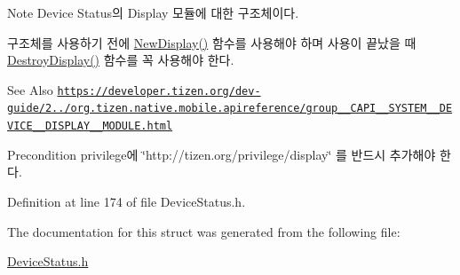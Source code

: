 \begin{DoxyNote}{Note}
Device Status의 Display 모듈에 대한 구조체이다. \par
 구조체를 사용하기 전에 \hyperlink{DeviceStatus_8h_a239d9485c4000ae77b11e5f12378f95f}{New\-Display()} 함수를 사용해야 하며 사용이 끝났을 때 \hyperlink{DeviceStatus_8h_aa18ddc0342d1ca47145c759a8fa35d91}{Destroy\-Display()} 함수를 꼭 사용해야 한다. 
\end{DoxyNote}
\begin{DoxySeeAlso}{See Also}
\href{https://developer.tizen.org/dev-guide/2.3.0/org.tizen.native.mobile.apireference/group__CAPI__SYSTEM__DEVICE__DISPLAY__MODULE.html}{\tt https\-://developer.\-tizen.\-org/dev-\/guide/2../org.\-tizen.\-native.\-mobile.\-apireference/group\-\_\-\-\_\-\-C\-A\-P\-I\-\_\-\-\_\-\-S\-Y\-S\-T\-E\-M\-\_\-\-\_\-\-D\-E\-V\-I\-C\-E\-\_\-\-\_\-\-D\-I\-S\-P\-L\-A\-Y\-\_\-\-\_\-\-M\-O\-D\-U\-L\-E.\-html} 
\end{DoxySeeAlso}
\begin{DoxyPrecond}{Precondition}
privilege에 \char`\"{}http\-://tizen.\-org/privilege/display\char`\"{} 를 반드시 추가해야 한다. 
\end{DoxyPrecond}


Definition at line 174 of file Device\-Status.\-h.



The documentation for this struct was generated from the following file\-:\begin{DoxyCompactItemize}
\item 
\hyperlink{DeviceStatus_8h}{Device\-Status.\-h}\end{DoxyCompactItemize}

